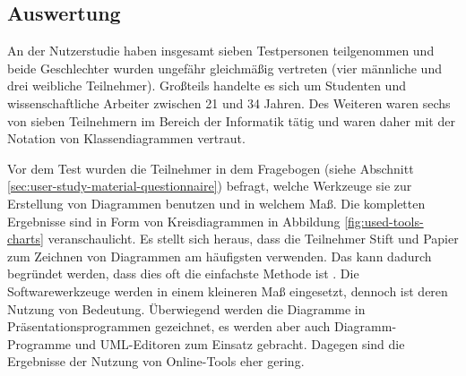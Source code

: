 \subsection{Auswertung}
\label{subsec:user-study-evaluation}

An der Nutzerstudie haben insgesamt sieben Testpersonen teilgenommen und beide Geschlechter wurden ungefähr gleichmäßig vertreten (vier männliche und drei weibliche Teilnehmer). Großteils handelte es sich um Studenten und wissenschaftliche Arbeiter zwischen 21 und 34 Jahren. Des Weiteren waren sechs von sieben Teilnehmern im Bereich der Informatik tätig und waren daher mit der Notation von Klassendiagrammen vertraut.

Vor dem Test wurden die Teilnehmer in dem Fragebogen (siehe Abschnitt \ref{sec:user-study-material-questionnaire}) befragt, welche Werkzeuge sie zur Erstellung von Diagrammen benutzen und in welchem Maß. Die kompletten Ergebnisse sind in Form von Kreisdiagrammen in Abbildung \ref{fig:used-tools-charts} veranschaulicht. Es stellt sich heraus, dass die Teilnehmer Stift und Papier zum Zeichnen von Diagrammen am häufigsten verwenden. Das kann dadurch begründet werden, dass dies oft die einfachste Methode ist \cite{Ambler02Agile}. Die Softwarewerkzeuge werden in einem kleineren Maß eingesetzt, dennoch ist deren Nutzung von Bedeutung. Überwiegend werden die Diagramme in Präsentationsprogrammen gezeichnet, es werden aber auch Diagramm-Programme und UML-Editoren zum Einsatz gebracht. Dagegen sind die Ergebnisse der Nutzung von Online-Tools eher gering. 

\vspace{0.25cm}

